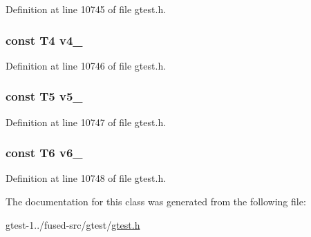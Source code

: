 \-Definition at line 10745 of file gtest.\-h.

\hypertarget{classtesting_1_1internal_1_1ValueArray6_aac184059fee257381ccae81d8d112f85}{
\subsubsection[{v4\-\_\-}]{\setlength{\rightskip}{0pt plus 5cm}const \-T4 {\bf v4\-\_\-}}}\label{d3/da9/classtesting_1_1internal_1_1ValueArray6_aac184059fee257381ccae81d8d112f85}


\-Definition at line 10746 of file gtest.\-h.

\hypertarget{classtesting_1_1internal_1_1ValueArray6_a1f3e0ada8419ed2e17cc61e6c0c54404}{
\subsubsection[{v5\-\_\-}]{\setlength{\rightskip}{0pt plus 5cm}const \-T5 {\bf v5\-\_\-}}}\label{d3/da9/classtesting_1_1internal_1_1ValueArray6_a1f3e0ada8419ed2e17cc61e6c0c54404}


\-Definition at line 10747 of file gtest.\-h.

\hypertarget{classtesting_1_1internal_1_1ValueArray6_a13d84d5824617bbc6fb1a6b3ee3cb745}{
\subsubsection[{v6\-\_\-}]{\setlength{\rightskip}{0pt plus 5cm}const \-T6 {\bf v6\-\_\-}}}\label{d3/da9/classtesting_1_1internal_1_1ValueArray6_a13d84d5824617bbc6fb1a6b3ee3cb745}


\-Definition at line 10748 of file gtest.\-h.



\-The documentation for this class was generated from the following file\-:\begin{DoxyCompactItemize}
\item 
gtest-\/1../fused-\/src/gtest/\hyperlink{fused-src_2gtest_2gtest_8h}{gtest.\-h}\end{DoxyCompactItemize}
